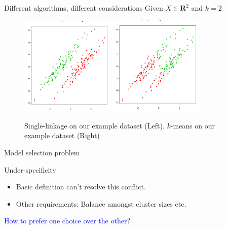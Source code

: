 \documentclass{beamer}
\newcommand{\mb}{\mathbf}
\begin{document}
\begin{frame}{Different algorithms, different considerations}
	Given $X \in \mb R^2$ and $k = 2$
	\begin{center}
	\begin{figure}
	\includegraphics[trim={0 0 0 20},clip,width=0.4\textwidth]{figures/slX.png}
	\includegraphics[trim={0 0 0 20},clip,width=0.4\textwidth]{figures/kmeansX.png}
	\caption{Single-linkage on our example dataset (Left). $k$-means on our example dataset (Right)}
	\end{figure}
	\end{center}
\end{frame}

\begin{frame}{Model selection problem}
	
	 Under-specificity\\
	\begin{itemize}
		\vspace{10pt}\item Basic definition \alert{can't} resolve this conflict.
		\vspace{10pt}\item Other requirements: Balance amongst cluster sizes etc. 
	\end{itemize}
	
	\vspace{20pt}\textcolor{blue}{How to prefer one choice over the other}?
\end{frame}
\end{document}
